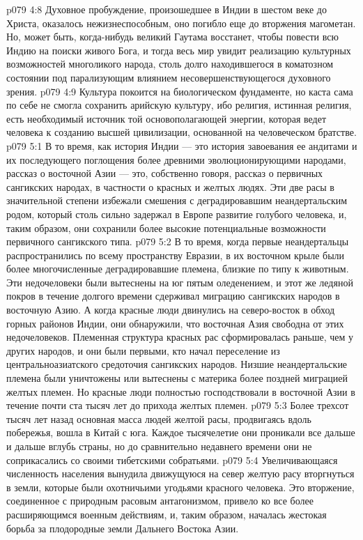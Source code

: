 \vs p079 4:8 Духовное пробуждение, произошедшее в Индии в шестом веке до Христа, оказалось нежизнеспособным, оно погибло еще до вторжения магометан. Но, может быть, когда\hyp{}нибудь великий Гаутама восстанет, чтобы повести всю Индию на поиски живого Бога, и тогда весь мир увидит реализацию культурных возможностей многоликого народа, столь долго находившегося в коматозном состоянии под парализующим влиянием несовершенствующегося духовного зрения.
\vs p079 4:9 Культура покоится на биологическом фундаменте, но каста сама по себе не смогла сохранить арийскую культуру, ибо религия, истинная религия, есть необходимый источник той основополагающей энергии, которая ведет человека к созданию высшей цивилизации, основанной на человеческом братстве.
\vs p079 5:1 В то время, как история Индии --- это история завоевания ее андитами и их последующего поглощения более древними эволюционирующими народами, рассказ о восточной Азии --- это, собственно говоря, рассказ о первичных сангикских народах, в частности о красных и желтых людях. Эти две расы в значительной степени избежали смешения с деградировавшим неандертальским родом, который столь сильно задержал в Европе развитие голубого человека, и, таким образом, они сохранили более высокие потенциальные возможности первичного сангикского типа.
\vs p079 5:2 В то время, когда первые неандертальцы распространились по всему пространству Евразии, в их восточном крыле были более многочисленные деградировавшие племена, близкие по типу к животным. Эти недочеловеки были вытеснены на юг пятым оледенением, и этот же ледяной покров в течение долгого времени сдерживал миграцию сангикских народов в восточную Азию. А когда красные люди двинулись на северо\hyp{}восток в обход горных районов Индии, они обнаружили, что восточная Азия свободна от этих недочеловеков. Племенная структура красных рас сформировалась раньше, чем у других народов, и они были первыми, кто начал переселение из центральноазиатского средоточия сангикских народов. Низшие неандертальские племена были уничтожены или вытеснены с материка более поздней миграцией желтых племен. Но красные люди полностью господствовали в восточной Азии в течение почти ста тысяч лет до прихода желтых племен.
\vs p079 5:3 \pc Более трехсот тысяч лет назад основная масса людей желтой расы, продвигаясь вдоль побережья, вошла в Китай с юга. Каждое тысячелетие они проникали все дальше и дальше вглубь страны, но до сравнительно недавнего времени они не соприкасались со своими тибетскими собратьями.
\vs p079 5:4 Увеличивающаяся численность населения вынудила движущуюся на север желтую расу вторгнуться в земли, которые были охотничьими угодьями красного человека. Это вторжение, соединенное с природным расовым антагонизмом, привело ко все более расширяющимся военным действиям, и, таким образом, началась жестокая борьба за плодородные земли Дальнего Востока Азии.
